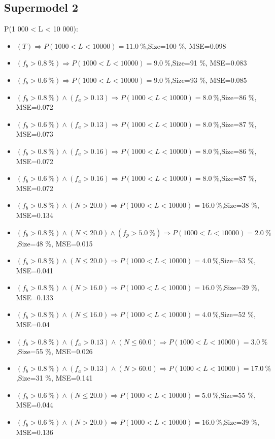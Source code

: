 \documentclass[numbered]{CSL}
\begin{document}
\subsection{Supermodel 2}
P(1 000 < L < 10 000):
\begin{itemize}
\item $(T) \Rightarrow P(1 000 < L < 10 000) = 11.0~\%$,\hfill Size=100 \%, MSE=0.098
\item $(f_b > 0.8~\%) \Rightarrow P(1 000 < L < 10 000) = 9.0~\%$,\hfill Size=91 \%, MSE=0.083
\item $(f_b > 0.6~\%) \Rightarrow P(1 000 < L < 10 000) = 9.0~\%$,\hfill Size=93 \%, MSE=0.085
\item $(f_b > 0.8~\%) \land (f_a > 0.13) \Rightarrow P(1 000 < L < 10 000) = 8.0~\%$,\hfill Size=86 \%, MSE=0.072
\item $(f_b > 0.6~\%) \land (f_a > 0.13) \Rightarrow P(1 000 < L < 10 000) = 8.0~\%$,\hfill Size=87 \%, MSE=0.073
\item $(f_b > 0.8~\%) \land (f_a > 0.16) \Rightarrow P(1 000 < L < 10 000) = 8.0~\%$,\hfill Size=86 \%, MSE=0.072
\item $(f_b > 0.6~\%) \land (f_a > 0.16) \Rightarrow P(1 000 < L < 10 000) = 8.0~\%$,\hfill Size=87 \%, MSE=0.072
\item $(f_b > 0.8~\%) \land (N > 20.0) \Rightarrow P(1 000 < L < 10 000) = 16.0~\%$,\hfill Size=38 \%, MSE=0.134
\item $(f_b > 0.8~\%) \land (N \leq 20.0) \land (f_p > 5.0~\%) \Rightarrow P(1 000 < L < 10 000) = 2.0~\%$,\hfill Size=48 \%, MSE=0.015
\item $(f_b > 0.8~\%) \land (N \leq 20.0) \Rightarrow P(1 000 < L < 10 000) = 4.0~\%$,\hfill Size=53 \%, MSE=0.041
\item $(f_b > 0.8~\%) \land (N > 16.0) \Rightarrow P(1 000 < L < 10 000) = 16.0~\%$,\hfill Size=39 \%, MSE=0.133
\item $(f_b > 0.8~\%) \land (N \leq 16.0) \Rightarrow P(1 000 < L < 10 000) = 4.0~\%$,\hfill Size=52 \%, MSE=0.04
\item $(f_b > 0.8~\%) \land (f_a > 0.13) \land (N \leq 60.0) \Rightarrow P(1 000 < L < 10 000) = 3.0~\%$,\hfill Size=55 \%, MSE=0.026
\item $(f_b > 0.8~\%) \land (f_a > 0.13) \land (N > 60.0) \Rightarrow P(1 000 < L < 10 000) = 17.0~\%$,\hfill Size=31 \%, MSE=0.141
\item $(f_b > 0.6~\%) \land (N \leq 20.0) \Rightarrow P(1 000 < L < 10 000) = 5.0~\%$,\hfill Size=55 \%, MSE=0.044
\item $(f_b > 0.6~\%) \land (N > 20.0) \Rightarrow P(1 000 < L < 10 000) = 16.0~\%$,\hfill Size=39 \%, MSE=0.136

\end{itemize}
\end{document}
